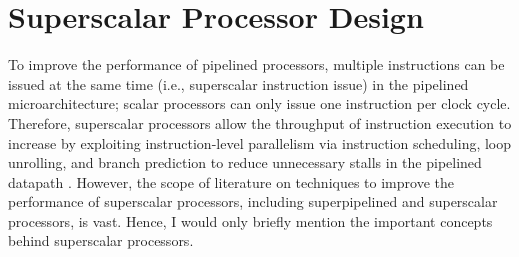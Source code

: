 








\section{Superscalar Processor Design}
\label{sec:SuperscalarProcessorDesign}


%    
%    

To improve the performance of pipelined processors, multiple instructions can be issued at the same time (i.e., superscalar instruction issue) in the pipelined microarchitecture; scalar processors can only issue one instruction per clock cycle. Therefore, superscalar processors allow the throughput of instruction execution to increase by exploiting instruction-level parallelism via instruction scheduling, loop unrolling, and branch prediction to reduce unnecessary stalls in the pipelined datapath \cite{Hennessy2012,Shen2005a}. However, the scope of literature on techniques to improve the performance of superscalar processors, including superpipelined and superscalar processors, is vast. Hence, I would only briefly mention the important concepts behind superscalar processors. \\



